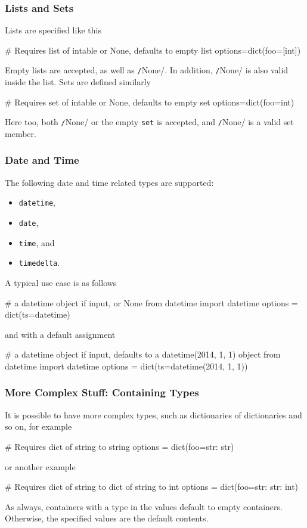 \subsubsection*{Lists and Sets}
Lists are specified like this
\begin{python}
# Requires list of intable or None, defaults to empty list
options=dict(foo=[int])
\end{python}
Empty lists are accepted, as well as \texttt/None/.  In
addition, \texttt/None/ is also valid inside the list.
Sets are defined similarly
\begin{python}
# Requires set of intable or None, defaults to empty set
options=dict(foo={int})
\end{python}
Here too, both \texttt/None/ or the empty \texttt{set} is
accepted, and \texttt/None/ is a valid set member.



\subsubsection*{Date and Time}
The following date and time related types are supported:
\begin{itemize}
\item[] \texttt{datetime},
\item[] \texttt{date},
\item[] \texttt{time}, and
\item[] \texttt{timedelta}.
\end{itemize}
A typical use case is as follows
\begin{python}
# a datetime object if input, or None
from datetime import datetime
options = dict(ts=datetime)
\end{python}
and with a default assignment
\begin{python}
#  a datetime object if input, defaults to a datetime(2014, 1, 1) object
from datetime import datetime
options = dict(ts=datetime(2014, 1, 1))
\end{python}



\subsubsection*{More Complex Stuff:  Containing Types}
It is possible to have more complex types, such as dictionaries of
dictionaries and so on, for example
\begin{python}
# Requires dict of string to string
options = dict(foo={str: str})
\end{python}
or another example
\begin{python}
# Requires dict of string to dict of string to int
options = dict(foo={str: {str: int}})
\end{python}
As always, containers with a type in the values default to empty
containers.  Otherwise, the specified values are the default contents.




